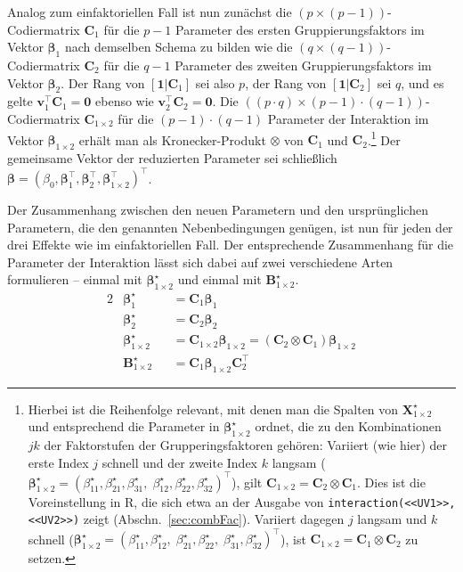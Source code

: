Analog zum einfaktoriellen Fall ist nun zunächst die $(p \times (p-1))$-Codiermatrix $\bm{C}_{1}$ für die $p-1$ Parameter des ersten Gruppierungsfaktors im Vektor $\bm{\beta}_{1}$ nach demselben Schema zu bilden wie die $(q \times (q-1))$-Codiermatrix $\bm{C}_{2}$ für die $q-1$ Parameter des zweiten Gruppierungsfaktors im Vektor $\bm{\beta}_{2}$. Der Rang von $[\bm{1}|\bm{C}_{1}]$ sei also $p$, der Rang von $[\bm{1}|\bm{C}_{2}]$ sei $q$, und es gelte $\bm{v}_{1}^{\top} \bm{C}_{1} = \bm{0}$ ebenso wie $\bm{v}_{2}^{\top} \bm{C}_{2} = \bm{0}$. Die $((p \cdot q) \times (p-1) \cdot (q-1))$-Codiermatrix $\bm{C}_{1 \times 2}$ für die $(p-1) \cdot (q-1)$ Parameter der Interaktion im Vektor $\bm{\beta}_{1 \times 2}$ erhält man als Kronecker-Produkt $\otimes$ von $\bm{C}_{1}$ und $\bm{C}_{2}$.\footnote{Hierbei ist die Reihenfolge relevant, mit denen man die Spalten von $\bm{X}_{1 \times 2}^{\star}$ und entsprechend die Parameter in $\bm{\beta}_{1 \times 2}^{\star}$ ordnet, die zu den Kombinationen $jk$ der Faktorstufen der Grupperingsfaktoren gehören: Variiert (wie hier) der erste Index $j$ schnell und der zweite Index $k$ langsam ($\bm{\beta}_{1 \times 2}^{\star} = (\beta_{11}^{\star}, \beta_{21}^{\star}, \beta_{31}^{\star},\; \beta_{12}^{\star}, \beta_{22}^{\star}, \beta_{32}^{\star})^{\top}$), gilt $\bm{C}_{1 \times 2} = \bm{C}_{2} \otimes \bm{C}_{1}$. Dies ist die Voreinstellung in R, die sich etwa an der Ausgabe von \lstinline!interaction(<<UV1>>, <<UV2>>)! zeigt (Abschn.\ \ref{sec:combFac}). Variiert dagegen $j$ langsam und $k$ schnell ($\bm{\beta}_{1 \times 2}^{\star} = (\beta_{11}^{\star}, \beta_{12}^{\star},\; \beta_{21}^{\star}, \beta_{22}^{\star},\; \beta_{31}^{\star}, \beta_{32}^{\star})^{\top}$), ist $\bm{C}_{1 \times 2} = \bm{C}_{1} \otimes \bm{C}_{2}$ zu setzen.} Der gemeinsame Vektor der reduzierten Parameter sei schließlich $\bm{\beta} = (\beta_{0}, \bm{\beta}_{1}^{\top}, \bm{\beta}_{2}^{\top}, \bm{\beta}_{1 \times 2}^{\top})^{\top}$.

Der Zusammenhang zwischen den neuen Parametern und den ursprünglichen Parametern, die den genannten Nebenbedingungen genügen, ist nun für jeden der drei Effekte wie im einfaktoriellen Fall. Der entsprechende Zusammenhang für die Parameter der Interaktion lässt sich dabei auf zwei verschiedene Arten formulieren -- einmal mit $\bm{\beta}_{1 \times 2}^{\star}$ und einmal mit $\bm{B}_{1 \times 2}^{\star}$.
\begin{alignat*}{2}
&\bm{\beta}_{1}^{\star} & &= \bm{C}_{1} \bm{\beta}_{1} \\
&\bm{\beta}_{2}^{\star} & &= \bm{C}_{2} \bm{\beta}_{2} \\
&\bm{\beta}_{1 \times 2}^{\star} & &= \bm{C}_{1 \times 2} \bm{\beta}_{1 \times 2} = (\bm{C}_{2} \otimes \bm{C}_{1}) \bm{\beta}_{1 \times 2} \\
&\bm{B}_{1 \times 2}^{\star} & &= \bm{C}_{1} \bm{\beta}_{1 \times 2} \bm{C}_{2}^{\top}
\end{alignat*}


